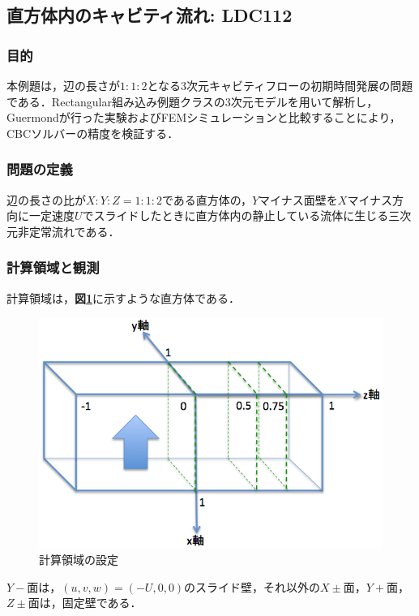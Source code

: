 
\graphicspath{{./fig_LDC112/}}

%
\subsection{直方体内のキャビティ流れ: LDC112}

\subsubsection{目的}
本例題は，辺の長さが$1:1:2$となる3次元キャビティフローの初期時間発展の問題である．Rectangular組み込み例題クラスの3次元モデルを用いて解析し，Guermond\cite{guermond:02:JFM}が行った実験およびFEMシミュレーションと比較することにより，CBCソルバーの精度を検証する．

\subsubsection{問題の定義}
辺の長さの比が$X:Y:Z=1:1:2$である直方体の，$Y$マイナス面壁を$X$マイナス方向に一定速度$U$でスライドしたときに直方体内の静止している流体に生じる三次元非定常流れである．

\subsubsection{計算領域と観測}
計算領域は，\textbf{図\ref{fig:LDC112}}に示すような直方体である．

\begin{figure}[htbp]
\centering
\includegraphics[width=12cm, bb=0 0 617 414]{LDC112.png}
\caption{計算領域の設定}
\label{fig:LDC112}
\end{figure}

$Y-$面は，$(u, v, w)=(-U, 0, 0)$のスライド壁，それ以外の$X\pm$面，$Y+$面，$Z\pm$面は，固定壁である．

